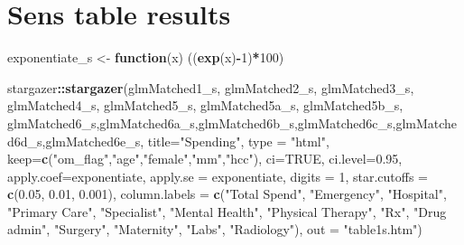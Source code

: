 \documentclass[]{article}
\newenvironment{Shaded}{\begin{snugshade}}{\end{snugshade}}
\newcommand{\KeywordTok}[1]{\textcolor[rgb]{0.13,0.29,0.53}{\textbf{#1}}}
\newcommand{\DataTypeTok}[1]{\textcolor[rgb]{0.13,0.29,0.53}{#1}}
\newcommand{\DecValTok}[1]{\textcolor[rgb]{0.00,0.00,0.81}{#1}}
\newcommand{\FloatTok}[1]{\textcolor[rgb]{0.00,0.00,0.81}{#1}}
\newcommand{\StringTok}[1]{\textcolor[rgb]{0.31,0.60,0.02}{#1}}
\newcommand{\OtherTok}[1]{\textcolor[rgb]{0.56,0.35,0.01}{#1}}
\newcommand{\ControlFlowTok}[1]{\textcolor[rgb]{0.13,0.29,0.53}{\textbf{#1}}}
\newcommand{\OperatorTok}[1]{\textcolor[rgb]{0.81,0.36,0.00}{\textbf{#1}}}
\newcommand{\NormalTok}[1]{#1}
\begin{document}
\section{Sens table results}\label{sens-table-results}

\begin{Shaded}
\begin{Highlighting}[]
\NormalTok{exponentiate_s <-}\StringTok{ }\ControlFlowTok{function}\NormalTok{(x) ((}\KeywordTok{exp}\NormalTok{(x)}\OperatorTok{-}\DecValTok{1}\NormalTok{)}\OperatorTok{*}\DecValTok{100}\NormalTok{)}

\NormalTok{stargazer}\OperatorTok{::}\KeywordTok{stargazer}\NormalTok{(glmMatched1_s, glmMatched2_s, glmMatched3_s, glmMatched4_s, glmMatched5_s, glmMatched5a_s, glmMatched5b_s, glmMatched6_s,glmMatched6a_s,glmMatched6b_s,glmMatched6c_s,glmMatched6d_s,glmMatched6e_s,}
          \DataTypeTok{title=}\StringTok{"Spending"}\NormalTok{, }
          \DataTypeTok{type =} \StringTok{"html"}\NormalTok{,}
          \DataTypeTok{keep=}\KeywordTok{c}\NormalTok{(}\StringTok{"om_flag"}\NormalTok{,}\StringTok{"age"}\NormalTok{,}\StringTok{"female"}\NormalTok{,}\StringTok{"mm"}\NormalTok{,}\StringTok{"hcc"}\NormalTok{),}
          \DataTypeTok{ci=}\OtherTok{TRUE}\NormalTok{, }\DataTypeTok{ci.level=}\FloatTok{0.95}\NormalTok{,}
          \DataTypeTok{apply.coef=}\NormalTok{exponentiate, }\DataTypeTok{apply.se =}\NormalTok{ exponentiate,}
          \DataTypeTok{digits =} \DecValTok{1}\NormalTok{, }
          \DataTypeTok{star.cutoffs =} \KeywordTok{c}\NormalTok{(}\FloatTok{0.05}\NormalTok{, }\FloatTok{0.01}\NormalTok{, }\FloatTok{0.001}\NormalTok{),}
          \DataTypeTok{column.labels =} \KeywordTok{c}\NormalTok{(}\StringTok{"Total Spend"}\NormalTok{, }\StringTok{"Emergency"}\NormalTok{, }\StringTok{"Hospital"}\NormalTok{, }\StringTok{"Primary Care"}\NormalTok{, }\StringTok{"Specialist"}\NormalTok{, }\StringTok{"Mental Health"}\NormalTok{, }\StringTok{"Physical Therapy"}\NormalTok{, }\StringTok{"Rx"}\NormalTok{, }\StringTok{"Drug admin"}\NormalTok{, }\StringTok{"Surgery"}\NormalTok{, }\StringTok{"Maternity"}\NormalTok{, }\StringTok{"Labs"}\NormalTok{, }\StringTok{"Radiology"}\NormalTok{),}
          \DataTypeTok{out =} \StringTok{"table1s.htm"}\NormalTok{)}
\end{Highlighting}
\end{Shaded}
\end{document}

